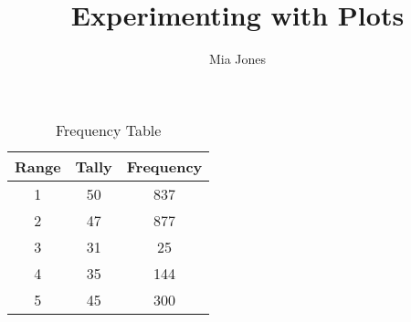 \documentclass[12pt]{article}
\begin{document}
\title{Experimenting with Plots}
\author{Mia Jones}

\maketitle


\begin{table}[ht]
\caption{Frequency Table}
\centering
\begin{tabular}{c c c}
\hline\hline 
Range & Tally & Frequency \\ [0.5ex]
\hline
1 & 50 & 837\\
\hline
2 & 47 & 877\\
\hline
3 & 31 & 25\\
\hline
4 & 35 & 144\\
\hline
5 & 45 & 300\\ [1ex] 
\hline 
\end{tabular}
\label{table:nonlin}
\end{table}
\end{document}

